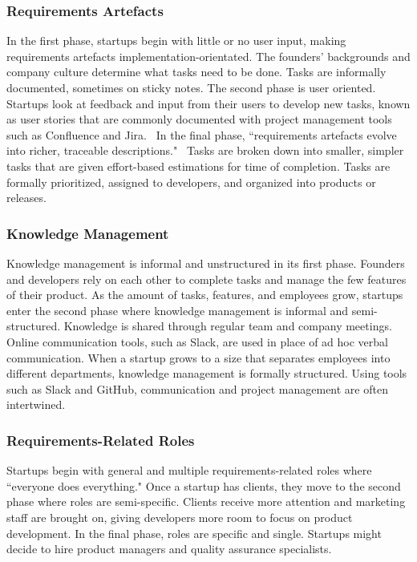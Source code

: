 \documentclass{sig-alternate}
\begin{document}
\subsubsection{Requirements Artefacts}
In the first phase, startups begin with little or no user input, making requirements artefacts implementation-orientated. The founders' backgrounds and company culture determine what tasks need to be done. Tasks are informally documented, sometimes on sticky notes. The second phase is user oriented. Startups look at feedback and input from their users to develop new tasks, known as user stories that are commonly documented with project management tools such as Confluence and Jira.~\cite{Gralha:2018} In the final phase, ``requirements artefacts evolve into richer, traceable descriptions."~\cite{Gralha:2018} Tasks are broken down into smaller, simpler tasks that are given effort-based estimations for time of completion. Tasks are formally prioritized, assigned to developers, and organized into products or releases.

\subsubsection{Knowledge Management}
Knowledge management is informal and unstructured in its first phase. Founders and developers rely on each other to complete tasks and manage the few features of their product. As the amount of tasks, features, and employees grow, startups enter the second phase where knowledge management is informal and semi-structured. Knowledge is shared through regular team and company meetings. Online communication tools, such as Slack, are used in place of ad hoc verbal communication. When a startup grows to a size that separates employees into different departments, knowledge management is formally structured. Using tools such as Slack and GitHub, communication and project management are often intertwined.

\subsubsection{Requirements-Related Roles}
Startups begin with general and multiple requirements-related roles where ``everyone does everything." Once a startup has clients, they move to the second phase where roles are semi-specific. Clients receive more attention and marketing staff are brought on, giving developers more room to focus on product development. In the final phase, roles are specific and single. Startups might decide to hire product managers and quality assurance specialists.
\end{document}
